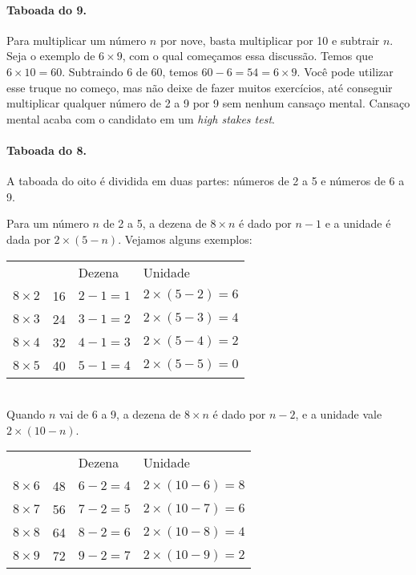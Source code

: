 \documentclass[12pt]{book}
\begin{document}
\paragraph{Taboada do 9.} Para multiplicar um número $n$ por
nove, basta multiplicar por 10 e subtrair $n$. Seja o exemplo
de $6\times 9$, com o qual começamos essa discussão. Temos
que $6\times 10= 60$. Subtraindo $6$ de $60$,
temos $60-6= 54= 6\times 9$. Você pode utilizar esse
truque no começo, mas não deixe de fazer muitos exercícios,
até conseguir multiplicar qualquer número de 2 a 9 por
9 sem nenhum cansaço mental. Cansaço mental acaba com
o candidato em um {\em high stakes test}.

\paragraph{Taboada do 8.} A taboada do oito é dividida
em duas partes: números de 2 a 5 e números de 6 a 9.

Para um número $n$ de 2 a 5, a dezena de $8\times n$
é dado por $n-1$ e a unidade é dada por $2\times (5-n)$.
Vejamos alguns exemplos:\\

\begin{tabular}{p{2cm}p{2cm}p{4cm}p{4cm}}
   &  & Dezena & Unidade\\
$8\times 2$ &16 & $2-1= 1$ & $2\times(5-2)=6$\\
$8\times 3$ &24 & $3-1= 2$ & $2\times(5-3)=4$\\
$8\times 4$ &32 & $4-1= 3$ & $2\times(5-4)=2$\\
$8\times 5$ &40 & $5-1= 4$ & $2\times(5-5)=0$\\
\end{tabular}

\verb||\\
Quando $n$ vai de 6 a 9, a dezena de $8\times n$ é
dado por $n-2$, e a unidade vale $2\times (10-n)$.\\

\begin{tabular}{p{2cm}p{2cm}p{4cm}p{4cm}}
   &  & Dezena & Unidade\\
$8\times 6$ & 48 & $6-2= 4$ & $2\times(10-6)=8$\\
$8\times 7$ &56 & $7-2= 5$ & $2\times(10-7)=6$\\
$8\times 8$ &64 & $8-2= 6$ & $2\times(10-8)=4$\\
$8\times 9$ &72 & $9-2= 7$ & $2\times(10-9)=2$\\
\end{tabular}
\end{document}
